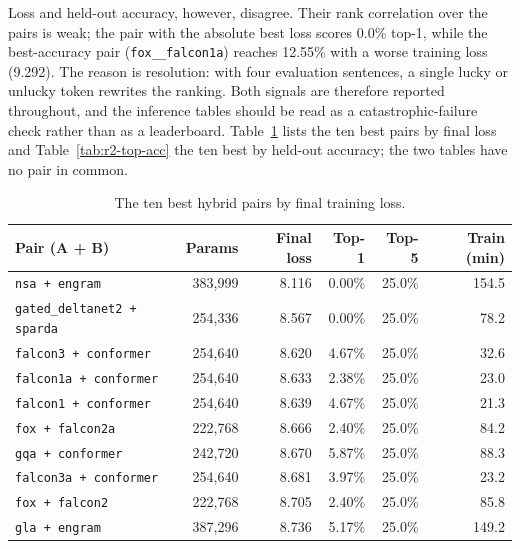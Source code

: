 Loss and held-out accuracy, however, disagree. Their rank correlation over the pairs is weak; the pair with the absolute best loss scores 0.0\% top-1, while the best-accuracy pair (\texttt{fox\_\_falcon1a}) reaches 12.55\% with a worse training loss (9.292). The reason is resolution: with four evaluation sentences, a single lucky or unlucky token rewrites the ranking. Both signals are therefore reported throughout, and the inference tables should be read as a catastrophic-failure check rather than as a leaderboard. Table~\ref{tab:r2-top-loss} lists the ten best pairs by final loss and Table~\ref{tab:r2-top-acc} the ten best by held-out accuracy; the two tables have no pair in common.

\begin{table}[H]
\centering
\small
\caption{The ten best hybrid pairs by final training loss.}
\label{tab:r2-top-loss}
\begin{tabular}{lrrrrr}
\toprule
Pair (A + B) & Params & Final loss & Top-1 & Top-5 & Train (min) \\
\midrule
\texttt{nsa + engram}            & 383{,}999 & 8.116 & 0.00\% & 25.0\% & 154.5 \\
\texttt{gated\_deltanet2 + sparda} & 254{,}336 & 8.567 & 0.00\% & 25.0\% & 78.2 \\
\texttt{falcon3 + conformer}     & 254{,}640 & 8.620 & 4.67\% & 25.0\% & 32.6 \\
\texttt{falcon1a + conformer}    & 254{,}640 & 8.633 & 2.38\% & 25.0\% & 23.0 \\
\texttt{falcon1 + conformer}     & 254{,}640 & 8.639 & 4.67\% & 25.0\% & 21.3 \\
\texttt{fox + falcon2a}          & 222{,}768 & 8.666 & 2.40\% & 25.0\% & 84.2 \\
\texttt{gqa + conformer}         & 242{,}720 & 8.670 & 5.87\% & 25.0\% & 88.3 \\
\texttt{falcon3a + conformer}    & 254{,}640 & 8.681 & 3.97\% & 25.0\% & 23.2 \\
\texttt{fox + falcon2}           & 222{,}768 & 8.705 & 2.40\% & 25.0\% & 85.8 \\
\texttt{gla + engram}            & 387{,}296 & 8.736 & 5.17\% & 25.0\% & 149.2 \\
\bottomrule
\end{tabular}
\end{table}

